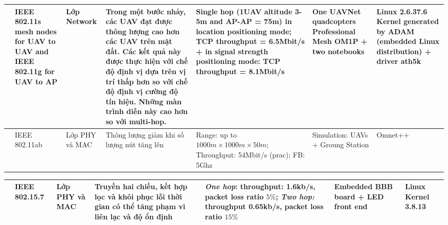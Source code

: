 \documentclass[11pt,openany]{book}
\begin{document}
\begin{landscape}
    \begin{table}[H]
        \centering
        \begin{tabular}{|p{1.5cm}|p{1.7cm}|p{1.3cm}|p{2.9cm}|p{2.7cm}|p{2.3cm}|p{2cm}|}\hline
            [Morgen- thaler et al., 2012] & IEEE 802.11s mesh nodes for UAV to UAV and IEEE 802.11g for UAV to AP & Lớp Network    & Trong một bước nhảy, các UAV đạt được thông lượng cao hơn các UAV trên mặt đất. Các kết quả này được thực hiện với chế độ định vị dựa trên vị trí thấp hơn so với chế độ định vị cường độ tín hiệu. Những màn trình diễn này cao hơn so với multi-hop. & Single hop (1UAV altitude 3-5m and AP-AP = 75m) in location positioning mode; TCP throughput = 6.5Mbit/s + in signal strength positioning mode: TCP throughput = 8.1Mbit/s & One UAVNet quadcopters Professional Mesh OM1P + two notebooks & Linux 2.6.37.6 Kernel generated by ADAM (embedded Linux distribution) + driver ath5k \\\hline
            [Muzaffar and Yanmaz, 2014]   & IEEE 802.11ab                                                         & Lớp PHY và MAC & Thông lượng giảm khi số lượng nút tăng lên                                                                                                                                                                                                             & Range: up to $1000m \times 1000m \times 50m$; Throughput: 54Mbit/s (prac); FB: 5Ghz                                                                                        & Simulation: UAVs + Groung Station                             & Omnet++                                                                              \\\hline
        \end{tabular}
    \end{table}
\end{landscape}
\begin{landscape}
    \begin{table}[H]
        \centering
        \begin{tabular}{|p{1.5cm}|p{1.7cm}|p{1.3cm}|p{2.9cm}|p{2.7cm}|p{2.3cm}|p{2cm}|}\hline
            [Wang et al., 2014] & IEEE 802.15.7 & Lớp PHY và MAC & Truyền hai chiều, kết hợp lọc và khôi phục lỗi thời gian có thể tăng phạm vi liên lạc và độ ổn định & \textit{One hop}: throughput: 1.6kb/s, packet loss ratio $5\%$; \textit{Two hop:} throughput 0.65kb/s, packet loss ratio $15\%$ & Embedded BBB board + LED front end & Linux Kernel 3.8.13 \\\hline
        \end{tabular}
    \end{table}
\end{landscape}
\end{document}
